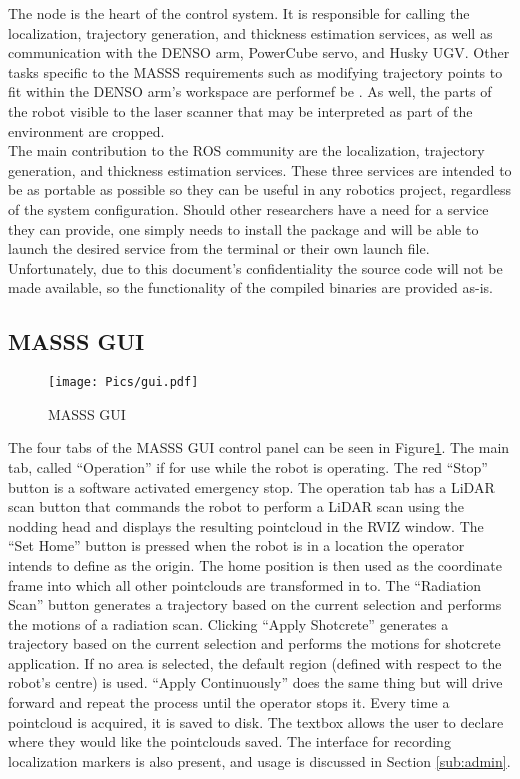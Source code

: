 The  node is the heart of the control system. It is responsible for calling the localization, trajectory generation, and thickness estimation services, as well as communication with the DENSO arm, PowerCube servo, and Husky UGV. Other tasks specific to the MASSS requirements such as modifying trajectory points to fit within the DENSO arm's workspace are performef be . As well, the parts of the robot visible to the laser scanner that may be interpreted as part of the environment are cropped.\\

The main contribution to the ROS community are the localization, trajectory generation, and thickness estimation services. These three services are intended to be as portable as possible so they can be useful in any robotics project, regardless of the system configuration. Should other researchers have a need for a service they can provide, one simply needs to install the package and will be able to launch the desired service from the terminal or their own launch file. Unfortunately, due to this document's confidentiality the source code will not be made available, so the functionality of the compiled binaries are provided as-is.\\

\subsection{MASSS GUI}
\label{sub:gui}

\begin{figure}[ht!]
    \centering
    \texttt{[image: Pics/gui.pdf]}
    \caption{MASSS GUI}
    \label{fig:thegui}
\end{figure}

The four tabs of the MASSS GUI control panel can be seen in Figure\ref{fig:thegui}. The main tab, called ``Operation'' if for use while the robot is operating. The red ``Stop'' button is a software activated emergency stop. The operation tab has a LiDAR scan button that commands the robot to perform a LiDAR scan using the nodding head and displays the resulting pointcloud in the RVIZ window. The ``Set Home'' button is pressed when the robot is in a location the operator intends to define as the origin. The home position is then used as the coordinate frame into which all other pointclouds are transformed in to. The ``Radiation Scan'' button generates a trajectory based on the current selection and performs the motions of a radiation scan. Clicking ``Apply Shotcrete'' generates a trajectory based on the current selection and performs the motions for shotcrete application. If no area is selected, the default region (defined with respect to the robot's centre) is used. ``Apply Continuously'' does the same thing but will drive forward and repeat the process until the operator stops it. Every time a pointcloud is acquired, it is saved to disk. The textbox allows the user to declare where they would like the pointclouds saved. The interface for recording localization markers is also present, and usage is discussed in Section \ref{sub:admin}.\\

